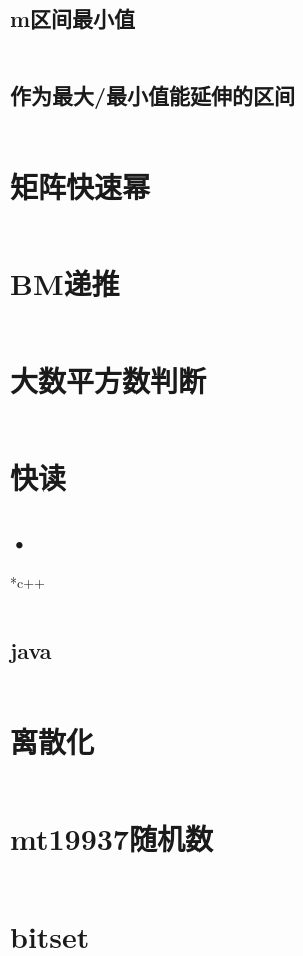 \documentclass[a4paper,11pt]{article}
\begin{document}
\subsection*{m区间最小值}
\inputminted[]{c++}{Template/Other/MonotonicQueueII.cpp}
\subsection*{作为最大/最小值能延伸的区间}
\inputminted[]{c++}{Template/Other/MonotonicQueueIII.cpp}

\section*{矩阵快速幂}
\inputminted[]{c++}{Template/Other/FastMat.cpp}
\section*{BM递推}
\inputminted[]{c++}{Template/Other/BM.cpp}
\section*{大数平方数判断}
\inputminted[]{java}{Template/Other/IsSquare.java}
\section*{快读}
\subsection*{•}*{c++}
\inputminted[]{c++}{Template/Other/fread.cpp}
\subsection*{java}
\inputminted[]{java}{Template/Other/fScan.java}
\section*{离散化}
\inputminted[]{c++}{Template/Other/Discretization.cpp}
\section*{mt19937随机数}
\inputminted[]{c++}{Template/Other/mt19937.cpp}
\section*{bitset}
\inputminted[]{c++}{Template/Other/bitset.cpp}
\end{document}
